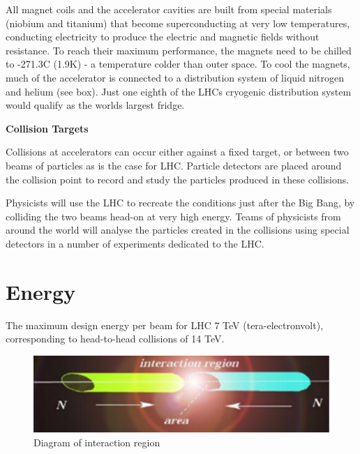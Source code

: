 \;
\;


\;
\noindent
All magnet coils and the accelerator cavities are built from special materials (niobium and titanium) that become superconducting at very low temperatures, conducting electricity to produce the electric and magnetic fields without resistance. To reach their maximum performance, the magnets need to be chilled to -271.3C (1.9K) - a temperature colder than outer space. To cool the magnets, much of the accelerator is connected to a distribution system of liquid nitrogen and helium (see box). Just one eighth of the LHCs cryogenic distribution system would qualify as the worlds largest fridge.

\;
\;
\;

\noindent
\textbf{Collision Targets}

\;
\;

\noindent
Collisions at accelerators can occur either against a fixed target, or between two beams of particles as is the case for LHC. Particle detectors are placed around the collision point to record and study the particles produced in these collisions.

\;
\noindent
Physicists will use the LHC to recreate the conditions just after the Big Bang, by colliding the two beams head-on at very high energy. Teams of physicists from around the world will analyse the particles created in the collisions using special detectors in a number of experiments dedicated to the LHC.

\section{Energy}


\noindent
The maximum design energy per beam for LHC 7 TeV (tera-electronvolt), corresponding to head-to-head collisions of 14 TeV.

\;
\;
\;

\begin{figure}[h]
\centering\includegraphics[scale=1.0]{./Particleaccelerators/Pictures/fig3.pdf}
\caption{Diagram of interaction region}
\label{fig:acc3}
\end{figure}

